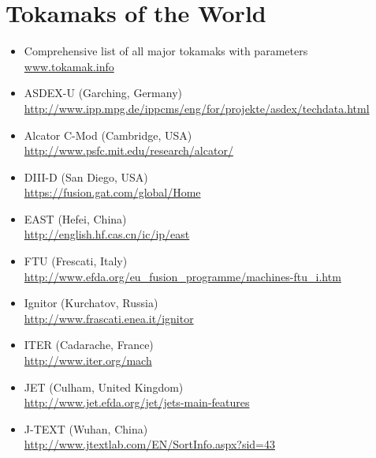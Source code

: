 \chapter{Tokamaks of the World}


\begin{itemize}

\item{Comprehensive list of all major tokamaks with parameters \\ \url{www.tokamak.info}}

\item{ASDEX-U \scriptsize(Garching, Germany)\\
  \url{http://www.ipp.mpg.de/ippcms/eng/for/projekte/asdex/techdata.html}}

\item{Alcator C-Mod \scriptsize(Cambridge, USA)\\ 
  \url{http://www.psfc.mit.edu/research/alcator/}}

\item{DIII-D \scriptsize(San Diego, USA)\\
  \url{https://fusion.gat.com/global/Home}}
\item{EAST \scriptsize(Hefei, China)\\
  \url{http://english.hf.cas.cn/ic/ip/east}}
\item{FTU \scriptsize(Frescati, Italy)\\
  \url{http://www.efda.org/eu\_fusion\_programme/machines-ftu\_i.htm}}

\item{Ignitor \scriptsize(Kurchatov, Russia)\\
  \url{http://www.frascati.enea.it/ignitor}}
  
\item{ITER \scriptsize(Cadarache, France)\\
  \url{http://www.iter.org/mach}}
  
\item{JET \scriptsize(Culham, United Kingdom)\\
  \url{http://www.jet.efda.org/jet/jets-main-features}}
  
\item{J-TEXT \scriptsize(Wuhan, China)\\
  \url{http://www.jtextlab.com/EN/SortInfo.aspx?sid=43}}
  

\end{itemize}
